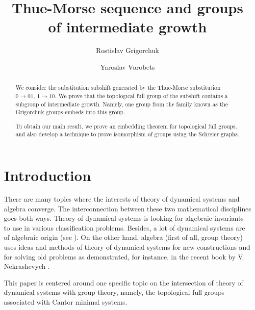 \documentclass[12pt]{article}
\title{Thue-Morse sequence and groups of intermediate growth}
\author{Rostislav Grigorchuk \and Yaroslav Vorobets}
\date{}
\theoremstyle{definition}
\begin{document}
\maketitle

\begin{abstract}
We consider the substitution subshift generated by the Thue-Morse 
substitution $0\to01$, $1\to10$.  We prove that the topological full group 
of the subshift contains a subgroup of intermediate growth.  Namely, one 
group from the family known as the Grigorchuk groups embeds into this group.

To obtain our main result, we prove an embedding theorem for topological 
full groups, and also develop a technique to prove isomorphism of groups 
using the Schreier graphs.
\end{abstract}

%
\section{Introduction}\label{sect-intro}

There are many topics where the interests of theory of dynamical systems 
and algebra converge.  The interconnection between these two mathematical 
disciplines goes both ways.  Theory of dynamical systems is looking for 
algebraic invariants to use in various classification problems.  Besides, a 
lot of dynamical systems are of algebraic origin (see \cite{Schmidt, 
LindSchmidt}).  On the other hand, algebra (first of all, group theory) 
uses ideas and methods of theory of dynamical systems for new constructions 
and for solving old problems as demonstrated, for instance, in the recent 
book by V. Nekrashevych \cite{Nek2022}.

This paper is centered around one specific topic on the intersection of 
theory of dynamical systems with group theory, namely, the topological full 
groups associated with Cantor minimal systems.
\end{document}
